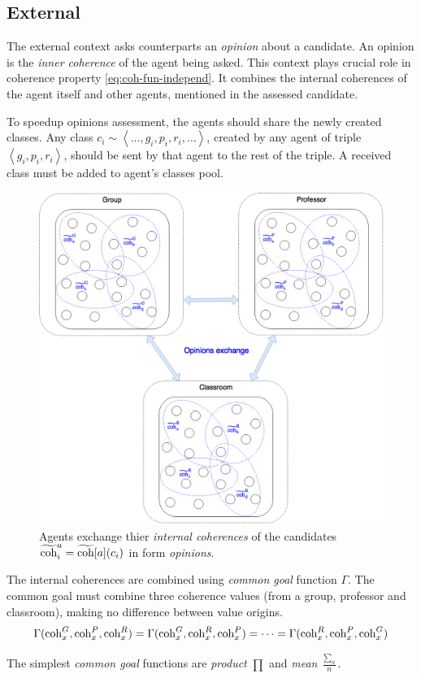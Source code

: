 \subsection{External}

The external context asks counterparts an \emph{opinion} about a candidate.
An opinion is the \emph{inner coherence} of the agent being asked. This context
plays crucial role in coherence property \ref{eq:coh-fun-independ}. It combines
the internal coherences of the agent itself and other agents, mentioned in the
assessed candidate.

To speedup opinions assessment, the agents should share the newly created classes.
Any class $c_i \sim \left< \dots, g_i, p_i, r_i, \dots \right>$, created by
any agent of triple $\left< g_i, p_i, r_i \right>$, should be sent by that
agent to the rest of the triple. A received class must be added to agent's
classes pool.

\begin{figure}[h]
  \label{fig:CandidatesShareOpinions}
  \includegraphics[width=\textwidth]{img/CandidatesShareOpinions.png}
  \caption{Agents exchange thier \emph{internal coherences} of the candidates
            $\mathrm{\widetilde{coh}}^a_i = \mathrm{\widetilde{coh}}[a](c_i)$ in form \emph{opinions}.
          }
\end{figure}

The internal coherences are combined using \emph{common goal} function $\Gamma$.
The common goal must combine three coherence values (from a group, professor and
classroom), making no difference between value origins.
$$
  \Gamma(\mathrm{coh}_x^G, \mathrm{coh}_x^P, \mathrm{coh}_x^R) = \Gamma(\mathrm{coh}_x^G, \mathrm{coh}_x^R, \mathrm{coh}_x^P)
    = \dots = \Gamma(\mathrm{coh}_x^R, \mathrm{coh}_x^P, \mathrm{coh}_x^G)
$$

The simplest \emph{common goal} functions are \emph{product} $\prod$
and \emph{mean} $\frac{\sum_n}{n}$.


